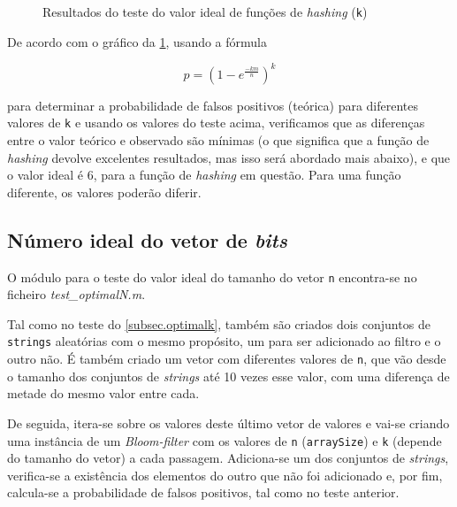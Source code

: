 \documentclass[a4paper,11pt,openright,oneside]{report}
\begin{document}
\begin{figure}[ht]	
\center
{}
\caption{Resultados do teste do valor ideal de funções de \textit{hashing} (\texttt{k})}
\label{fig:optimalk}
\end{figure}

De acordo com o gráfico da \ref{fig:optimalk}, usando a fórmula 

$$ p =  (1 - e^\frac{-km}{n})^k $$

para determinar a probabilidade de falsos positivos (teórica) para diferentes valores de \texttt{k} e usando os valores do teste acima, verificamos que as diferenças entre o valor teórico e observado são mínimas (o que significa que a função de \textit{hashing} devolve excelentes resultados, mas isso será abordado mais abaixo), e que o valor ideal é 6, para a função de \textit{hashing} em questão. Para uma função diferente, os valores poderão diferir.

\subsection{Número ideal do vetor de \textit{bits}}
\label{subsec.optimaln}

O módulo para o teste do valor ideal do tamanho do vetor \texttt{n} encontra-se no ficheiro \textit{test_optimalN.m}.

Tal como no teste do \autoref{subsec.optimalk}, também são criados dois conjuntos de \texttt{strings} aleatórias com o mesmo propósito, um para ser adicionado ao filtro e o outro não. É também criado um vetor com diferentes valores de \texttt{n}, que vão desde o tamanho dos conjuntos de \textit{strings} até 10 vezes esse valor, com uma diferença de metade do mesmo valor entre cada.

De seguida, itera-se sobre os valores deste último vetor de valores e vai-se criando uma instância de um \textit{Bloom-filter} com os valores de \texttt{n} (\texttt{arraySize}) e \texttt{k} (depende do tamanho do vetor) a cada passagem. Adiciona-se um dos conjuntos de \textit{strings}, verifica-se a existência dos elementos do outro que não foi adicionado e, por fim, calcula-se a probabilidade de falsos positivos, tal como no teste anterior.
\end{document}
